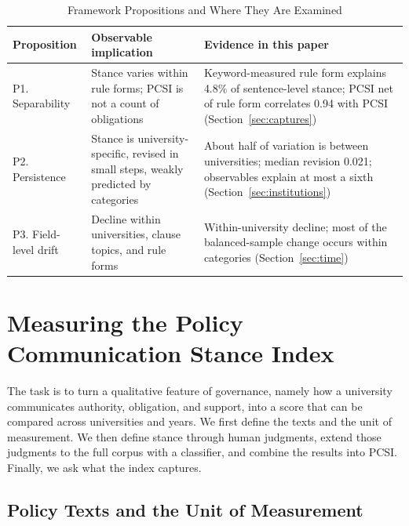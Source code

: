 \documentclass[11pt]{article}
\begin{document}
\begin{table}[htbp]
\centering
\small
\caption{Framework Propositions and Where They Are Examined}
\label{tab:framework}
\begin{threeparttable}
\begin{tabular}{>{\raggedright\arraybackslash}p{}>{\raggedright\arraybackslash}p{}>{\raggedright\arraybackslash}p{}}
\toprule
Proposition & Observable implication & Evidence in this paper \\
\midrule
P1. Separability & Stance varies within rule forms; PCSI is not a count of obligations & Keyword-measured rule form explains 4.8\% of sentence-level stance; PCSI net of rule form correlates 0.94 with PCSI (Section~\ref{sec:captures}) \\
P2. Persistence & Stance is university-specific, revised in small steps, weakly predicted by categories & About half of variation is between universities; median revision 0.021; observables explain at most a sixth (Section~\ref{sec:institutions}) \\
P3. Field-level drift & Decline within universities, clause topics, and rule forms & Within-university decline; most of the balanced-sample change occurs within categories (Section~\ref{sec:time}) \\
\bottomrule
\end{tabular}
\end{threeparttable}
\end{table}

\FloatBarrier

\section{Measuring the Policy Communication Stance Index}\label{sec:measure}

The task is to turn a qualitative feature of governance, namely how a university communicates authority, obligation, and support, into a score that can be compared across universities and years. We first define the texts and the unit of measurement. We then define stance through human judgments, extend those judgments to the full corpus with a classifier, and combine the results into PCSI. Finally, we ask what the index captures.

\subsection{Policy Texts and the Unit of Measurement}
\end{document}
